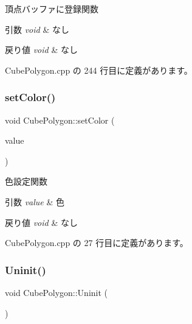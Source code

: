 頂点バッファに登録関数 


\begin{DoxyParams}{引数}
{\em void} & なし \\
\hline
\end{DoxyParams}

\begin{DoxyRetVals}{戻り値}
{\em void} & なし \\
\hline
\end{DoxyRetVals}


 Cube\+Polygon.\+cpp の 244 行目に定義があります。

\mbox{\label{class_cube_polygon_a8b127a1bdec7373c0dcf73540f4d9df1}} 
\subsubsection{\texorpdfstring{set\+Color()}{setColor()}}
{\footnotesize\ttfamily void Cube\+Polygon\+::set\+Color (\begin{DoxyParamCaption}\item[{\mbox{\hyperlink{_vector3_d_8h_a680c30c4a07d86fe763c7e01169cd6cc}{X\+Color4}}}]{value }\end{DoxyParamCaption})}



色設定関数 


\begin{DoxyParams}{引数}
{\em value} & 色 \\
\hline
\end{DoxyParams}

\begin{DoxyRetVals}{戻り値}
{\em void} & なし \\
\hline
\end{DoxyRetVals}


 Cube\+Polygon.\+cpp の 27 行目に定義があります。

\mbox{\label{class_cube_polygon_a38d28c7285ef8a75cb5b0a69a90ac829}} 
\subsubsection{\texorpdfstring{Uninit()}{Uninit()}}
{\footnotesize\ttfamily void Cube\+Polygon\+::\+Uninit (\begin{DoxyParamCaption}{ }\end{DoxyParamCaption})}



